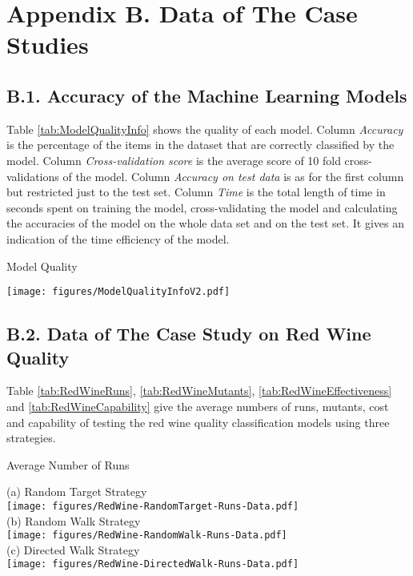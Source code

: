 \documentclass[preprint,1p,authoryear,times]{elsarticle}
\begin{document}
\newpage
\section*{Appendix B. Data of The Case Studies}

\subsection*{B.1. Accuracy of the Machine Learning Models}

Table \ref{tab:ModelQualityInfo} shows the quality of each model. Column \emph{Accuracy} is the percentage of the items in the dataset that are correctly classified by the model. Column \emph{Cross-validation score} is the average score of 10 fold cross-validations of the model. Column \emph{Accuracy on test data} is as for the first column but restricted just to the test set. Column \emph{Time} is the total length of time in seconds spent on training the model, cross-validating the model and calculating the accuracies of the model on the whole data set and on the test set. It gives an indication of the time efficiency of the model.

\begin{table}[htbp]
	\caption{Model Quality}	\label{tab:ModelQualityInfo}
	\begin{center}
	\texttt{[image: figures/ModelQualityInfoV2.pdf]}
	\end{center}
\end{table}

\newpage
\subsection*{B.2. Data of The Case Study on Red Wine Quality}

Table \ref{tab:RedWineRuns}, \ref{tab:RedWineMutants}, \ref{tab:RedWineEffectiveness} and \ref{tab:RedWineCapability} give the average numbers of runs, mutants, cost and capability of   testing the red wine quality classification models using three strategies.  

\begin{table}[htbp]
	\caption{Average Number of Runs}	\label{tab:RedWineRuns}
	\begin{center}
	\scriptsize{(a) Random Target Strategy}\\
	\texttt{[image: figures/RedWine-RandomTarget-Runs-Data.pdf]}\\
	\scriptsize{(b) Random Walk Strategy}\\
	\texttt{[image: figures/RedWine-RandomWalk-Runs-Data.pdf]}\\
		\scriptsize{(c) Directed Walk Strategy}\\
	\texttt{[image: figures/RedWine-DirectedWalk-Runs-Data.pdf]}\\
	\end{center}
\end{table}
\end{document}
